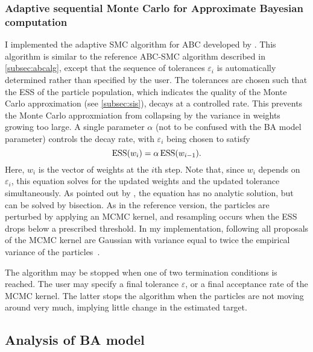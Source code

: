 \subsubsection*{Adaptive sequential Monte Carlo for Approximate Bayesian computation}
\label{subsubsec:adaptsmc}

I implemented the adaptive \gls{SMC} algorithm for \gls{ABC} developed by
\textcite{del2012adaptive}. This algorithm is similar to the reference
\gls{ABC}-\gls{SMC} algorithm described in \cref{subsec:abcalg}, except that
the sequence of tolerances $\varepsilon_i$ is automatically determined rather
than specified by the user. The tolerances are chosen such that the \gls{ESS}
of the particle population, which indicates the quality of the Monte Carlo
approximation (see \cref{subsec:sis}), decays at a controlled rate. This
prevents the Monte Carlo approxmiation from collapsing by the variance in
weights growing too large. A single parameter $\alpha$ (not to be confused with
the \gls{BA} model parameter) controls the decay rate, with $\varepsilon_i$
being chosen to satisfy
\[
  \operatorname{ESS}(w_i) = \alpha \operatorname{ESS}(w_{i-1}).
\]
Here, $w_i$ is the vector of weights at the $i$th step. Note that, since $w_i$
depends on $\varepsilon_i$, this equation solves for the updated weights and
the updated tolerance simultaneously. As pointed out by
\textcite{del2012adaptive}, the equation has no analytic solution, but can be
solved by bisection. As in the reference version, the particles are perturbed
by applying an \gls{MCMC} kernel, and resampling occurs when the \gls{ESS}
drops below a prescribed threshold. In my implementation, following all
proposals of the \gls{MCMC} kernel are Gaussian with variance equal to twice
the empirical variance of the
particles~\autocite{beaumont2009adaptive,del2012adaptive}.

The algorithm may be stopped when one of two termination conditions is reached.
The user may specify a final tolerance $\varepsilon$, or a final acceptance
rate of the \gls{MCMC} kernel. The latter stops the algorithm when the
particles are not moving around very much, implying little change in the
estimated target. 

\subsection{Analysis of \acrlong{BA} model}

